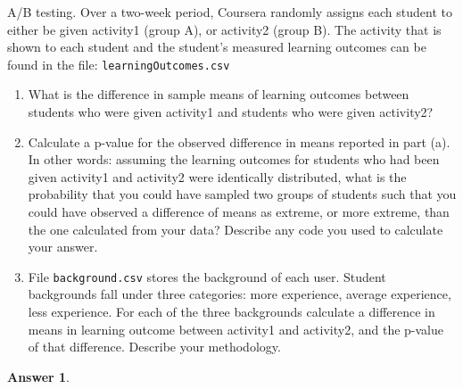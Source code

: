 \documentclass[12pt]{article}
\renewcommand{\(}{\left(}
\renewcommand{\)}{\right)}
\theoremstyle{definition}
\newtheorem*{answer}{Answer}
\begin{document}
\begin{enumerate}
{    \item A/B testing. Over a two-week period, Coursera randomly assigns each student to either be given activity1 (group A), or activity2 (group B). The activity that is shown to each student and the student's measured learning outcomes can be found in the file: \texttt{learningOutcomes.csv}
    \begin{enumerate}
        \item What is the difference in sample means of learning outcomes between students who were given activity1 and students who were given activity2?
        \item Calculate a p-value for the observed difference in means reported in part (a). In other words: assuming the learning outcomes for students who had been given activity1 and activity2 were identically distributed, what is the probability that you could have sampled two groups of students such that you could have observed a difference of means as extreme, or more extreme, than the one calculated from your data? Describe any code you used to calculate your answer.
        \item File \texttt{background.csv} stores the background of each user. Student backgrounds fall under three categories: more experience, average experience, less experience. For each of the three backgrounds calculate a difference in means in learning outcome between activity1 and activity2, and the p-value of that difference. Describe your methodology.
    \end{enumerate}
    
    \begin{shaded}
    \begin{answer}
    
    \end{answer}
    \end{shaded}
    \newpage
    
}
\end{enumerate}
\end{document}
